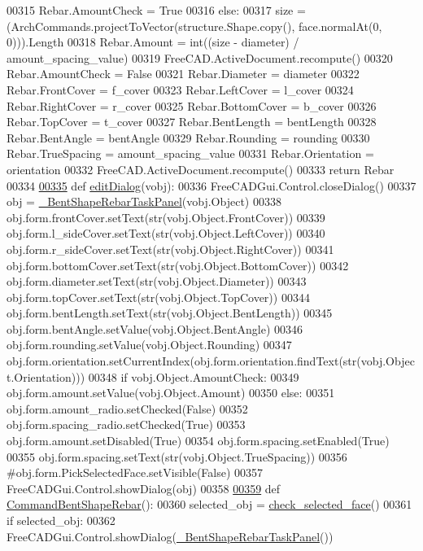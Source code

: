 \begin{DoxyCode}
00315         Rebar.AmountCheck = \textcolor{keyword}{True}
00316     \textcolor{keywordflow}{else}:
00317         size = (ArchCommands.projectToVector(structure.Shape.copy(), face.normalAt(0, 0))).Length
00318         Rebar.Amount = int((size - diameter) / amount\_spacing\_value)
00319         FreeCAD.ActiveDocument.recompute()
00320         Rebar.AmountCheck = \textcolor{keyword}{False}
00321     Rebar.Diameter = diameter
00322     Rebar.FrontCover = f\_cover
00323     Rebar.LeftCover = l\_cover
00324     Rebar.RightCover = r\_cover
00325     Rebar.BottomCover = b\_cover
00326     Rebar.TopCover = t\_cover
00327     Rebar.BentLength = bentLength
00328     Rebar.BentAngle = bentAngle
00329     Rebar.Rounding = rounding
00330     Rebar.TrueSpacing = amount\_spacing\_value
00331     Rebar.Orientation = orientation
00332     FreeCAD.ActiveDocument.recompute()
00333     \textcolor{keywordflow}{return} Rebar
00334 
\hypertarget{BentShapeRebar_8py_source.tex_l00335}{}\hyperlink{namespaceBentShapeRebar_ae5db82a49148a0a8f6fa567fa72d93b2}{00335} \textcolor{keyword}{def }\hyperlink{namespaceBentShapeRebar_ae5db82a49148a0a8f6fa567fa72d93b2}{editDialog}(vobj):
00336     FreeCADGui.Control.closeDialog()
00337     obj = \hyperlink{classBentShapeRebar_1_1__BentShapeRebarTaskPanel}{\_BentShapeRebarTaskPanel}(vobj.Object)
00338     obj.form.frontCover.setText(str(vobj.Object.FrontCover))
00339     obj.form.l\_sideCover.setText(str(vobj.Object.LeftCover))
00340     obj.form.r\_sideCover.setText(str(vobj.Object.RightCover))
00341     obj.form.bottomCover.setText(str(vobj.Object.BottomCover))
00342     obj.form.diameter.setText(str(vobj.Object.Diameter))
00343     obj.form.topCover.setText(str(vobj.Object.TopCover))
00344     obj.form.bentLength.setText(str(vobj.Object.BentLength))
00345     obj.form.bentAngle.setValue(vobj.Object.BentAngle)
00346     obj.form.rounding.setValue(vobj.Object.Rounding)
00347     obj.form.orientation.setCurrentIndex(obj.form.orientation.findText(str(vobj.Object.Orientation)))
00348     \textcolor{keywordflow}{if} vobj.Object.AmountCheck:
00349         obj.form.amount.setValue(vobj.Object.Amount)
00350     \textcolor{keywordflow}{else}:
00351         obj.form.amount\_radio.setChecked(\textcolor{keyword}{False})
00352         obj.form.spacing\_radio.setChecked(\textcolor{keyword}{True})
00353         obj.form.amount.setDisabled(\textcolor{keyword}{True})
00354         obj.form.spacing.setEnabled(\textcolor{keyword}{True})
00355         obj.form.spacing.setText(str(vobj.Object.TrueSpacing))
00356     \textcolor{comment}{#obj.form.PickSelectedFace.setVisible(False)}
00357     FreeCADGui.Control.showDialog(obj)
00358 
\hypertarget{BentShapeRebar_8py_source.tex_l00359}{}\hyperlink{namespaceBentShapeRebar_abc4f0ada7811da5cf9174551bc3c6b37}{00359} \textcolor{keyword}{def }\hyperlink{namespaceBentShapeRebar_abc4f0ada7811da5cf9174551bc3c6b37}{CommandBentShapeRebar}():
00360     selected\_obj = \hyperlink{namespaceRebarfunc_adae2713855a7e1b4bda04081ae671542}{check\_selected\_face}()
00361     \textcolor{keywordflow}{if} selected\_obj:
00362         FreeCADGui.Control.showDialog(\hyperlink{classBentShapeRebar_1_1__BentShapeRebarTaskPanel}{\_BentShapeRebarTaskPanel}())
\end{DoxyCode}
